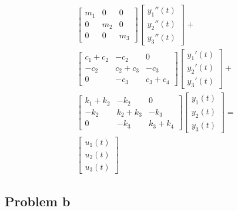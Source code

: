\documentclass[12pt,a4paper]{article}
\begin{document}
 \begin{equation}
    \begin{split}
    &\begin{bmatrix}
        m_1 & 0   & 0   \\
        0   & m_2 & 0   \\
        0   & 0   & m_3
    \end{bmatrix}
    \begin{bmatrix}
        y_1''(t) \\
        y_2''(t) \\
        y_3''(t)
    \end{bmatrix} + \\
    &\begin{bmatrix}
        c_1+c_2         & -c_2             & 0              \\
        -c_2            & c_2+c_3         & -c_3       \\
        0               & -c_3           & c_3+c_4
    \end{bmatrix}
    \begin{bmatrix}
        y_1'(t) \\
        y_2'(t) \\
        y_3'(t)
    \end{bmatrix} + \\
    &\begin{bmatrix}
        k_1+k_2         & -k_2             & 0              \\
        -k_2            & k_2+k_3         & -k_3       \\
        0               & -k_3           & k_3+k_4
    \end{bmatrix}
    \begin{bmatrix}
        y_1(t) \\
        y_2(t) \\
        y_3(t)
    \end{bmatrix} = \\
    &\begin{bmatrix}
        u_1(t) \\
        u_2(t) \\
        u_3(t)
    \end{bmatrix}
    \end{split}
\end{equation}

\subsection*{Problem b}
\end{document}
